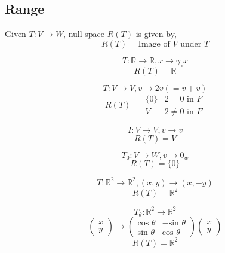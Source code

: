 \documentclass[11pt,a4paper]{colorart}
\def\l{\left}
\def\r{\right}
\def\R{\mathbb{R}}
\def\g{\gamma}
\begin{document}
\subsection{Range}

\begin{definition}[Range]
	Given $T:V\rightarrow W $, null space $R\l(T\r)$ is given by,
	\[ R\l(T\r) = \text{Image of $V$ under $T$} \] 
\end{definition}

\begin{example}
	\[ T:\R\rightarrow\R,x\rightarrow\g_\circ x\]
	\[ R\l(T\r) = \R \]
\end{example}

\begin{example}[Dilation]
	\[ T:V \rightarrow V,v\rightarrow 2v \l(=v+v\r)\]
	\[ R\l(T\r) = \begin{matrix} \{0\} & 2 = 0 \text{ in } F \\ V & 2 \neq 0 \text{ in } F \end{matrix} \]
\end{example}

\begin{example}
	\[ I:V \rightarrow V, v\rightarrow v\]
	\[ R\l(T\r) = V \]
\end{example}

\begin{example}
	\[ T_0:V\rightarrow W, v \rightarrow 0_w \]
	\[ R\l(T\r) = \{0\} \]
\end{example}

\begin{example}[Reflection]
	\[ T:\R^2 \rightarrow \R^2,\l(x,y\r)\rightarrow\l(x,-y\r) \]
	\[ R\l(T\r) = \R^2\]
\end{example}

\begin{example}[Rotation]
	\[ T_\theta : \R^2 \rightarrow \R^2 \]
	\[ \begin{pmatrix} x\\y\end{pmatrix} \rightarrow
	   \begin{pmatrix} \text{cos }\theta &-\text{sin }\theta\\
	   \text{sin }\theta & \text{cos }\theta \end{pmatrix} 
	   \begin{pmatrix} x\\y\end{pmatrix}\]
	\[ R\l(T\r) = \R^2 \]
\end{example}
\end{document}
